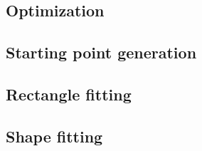 \subsection{Optimization}

\subsection{Starting point generation}

\subsection{Rectangle fitting}

\subsection{Shape fitting}





